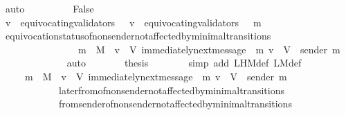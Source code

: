\begin{isabellebody}
\ auto\ \isanewline
\ \ \isamarkupfalse%
\isanewline
\ \ \ \ \isamarkupfalse%
\ False\isanewline
\ \ \ \ \isamarkupfalse%
\ \isamarkupfalse%
\ {\isachardoublequoteopen}v\ {\isasymnotin}\ equivocating{\isacharunderscore}validators\ {\isasymsigma}\ {\isasymand}\ v\ {\isasymnotin}\ equivocating{\isacharunderscore}validators\ {\isacharparenleft}{\isasymsigma}\ {\isasymunion}\ {\isacharbraceleft}m{\isacharbraceright}{\isacharparenright}{\isachardoublequoteclose}\isanewline
\ \ \ \ \ \ \isamarkupfalse%
\ equivocation{\isacharunderscore}status{\isacharunderscore}of{\isacharunderscore}non{\isacharunderscore}sender{\isacharunderscore}not{\isacharunderscore}affected{\isacharunderscore}by{\isacharunderscore}minimal{\isacharunderscore}transitions\isanewline
\ \ \ \ \ \ \ \ \ \ \ \ {\isacartoucheopen}{\isasymsigma}\ {\isasymin}\ {\isasymSigma}\ {\isasymand}\ m\ {\isasymin}\ M\ {\isasymand}\ v\ {\isasymin}\ V{\isacartoucheclose}\ {\isacartoucheopen}immediately{\isacharunderscore}next{\isacharunderscore}message\ {\isacharparenleft}{\isasymsigma}{\isacharcomma}\ m{\isacharparenright}{\isacartoucheclose}\ {\isacartoucheopen}v\ {\isasymin}\ V\ {\isacharminus}\ {\isacharbraceleft}sender\ m{\isacharbraceright}{\isacartoucheclose}\ \isanewline
\ \ \ \ \ \ \ \ \ \ \ \ \isamarkupfalse%
\ auto\isanewline
\ \ \ \ \isamarkupfalse%
\ \isamarkupfalse%
\ {\isacharquery}thesis\isanewline
\ \ \ \ \ \ \isamarkupfalse%
\ {\isacharparenleft}simp\ add{\isacharcolon}\ L{\isacharunderscore}H{\isacharunderscore}M{\isacharunderscore}def\ L{\isacharunderscore}M{\isacharunderscore}def{\isacharparenright}\isanewline
\ \ \ \ \ \ \isamarkupfalse%
\ {\isacartoucheopen}{\isasymsigma}\ {\isasymin}\ {\isasymSigma}\ {\isasymand}\ m\ {\isasymin}\ M\ {\isasymand}\ v\ {\isasymin}\ V{\isacartoucheclose}\ {\isacartoucheopen}immediately{\isacharunderscore}next{\isacharunderscore}message\ {\isacharparenleft}{\isasymsigma}{\isacharcomma}\ m{\isacharparenright}{\isacartoucheclose}\ {\isacartoucheopen}v\ {\isasymin}\ V\ {\isacharminus}\ {\isacharbraceleft}sender\ m{\isacharbraceright}{\isacartoucheclose}\isanewline
\ \ \ \ \ \ \ \ \ \ \ \ later{\isacharunderscore}from{\isacharunderscore}of{\isacharunderscore}non{\isacharunderscore}sender{\isacharunderscore}not{\isacharunderscore}affected{\isacharunderscore}by{\isacharunderscore}minimal{\isacharunderscore}transitions\isanewline
\ \ \ \ \ \ \ \ \ \ \ \ from{\isacharunderscore}sender{\isacharunderscore}of{\isacharunderscore}non{\isacharunderscore}sender{\isacharunderscore}not{\isacharunderscore}affected{\isacharunderscore}by{\isacharunderscore}minimal{\isacharunderscore}transitions\isanewline

\end{isabellebody}
